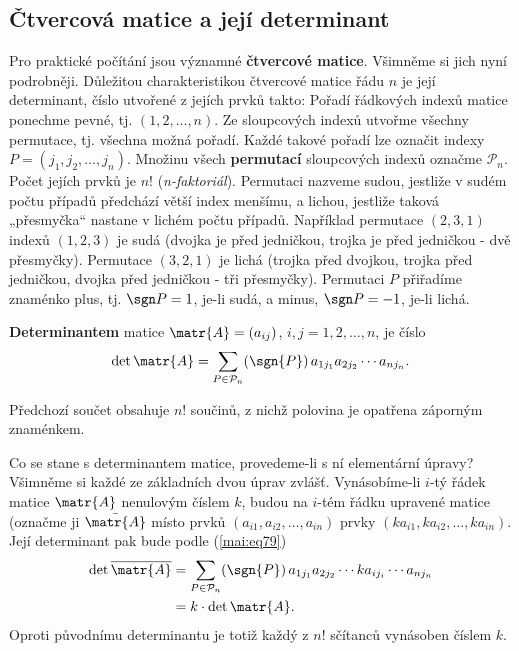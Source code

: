    \subsection{Čtvercová matice a její determinant}\label{mai:IchapIIsecIIIsubIV}
      Pro praktické počítání jsou významné \textbf{čtvercové matice}. Všimněme si jich nyní
      podrobněji. Důležitou charakteristikou čtvercové matice řádu \(n\) je její determinant, číslo
      utvořené z jejích prvků takto: Pořadí řádkových indexů matice ponechme pevné, tj. \((1,2,...,
      n)\). Ze sloupcových indexů utvořme všechny permutace, tj. všechna možná pořadí. Každé takové
      pořadí lze označit indexy \(P = (j_1, j_2, \ldots, j_n)\). Množinu všech \textbf{permutací}
      sloupcových indexů označme \(\mathcal{P}_n\). Počet jejích prvků je \(n!\)
      (\emph{n-faktoriál}). Permutaci nazveme sudou, jestliže v sudém počtu případů předchází větší
      index menšímu, a lichou, jestliže taková „přesmyčka“ nastane v lichém počtu případů. Například
      permutace \((2,3,1)\) indexů \((1,2,3)\) je sudá (dvojka je před jedničkou, trojka je před
      jedničkou - dvě přesmyčky). Permutace \((3,2,1)\) je lichá (trojka před dvojkou, trojka před
      jedničkou, dvojka před jedničkou - tři přesmyčky). Permutaci \(P\) přiřadíme znaménko plus,
      tj. \(\sgn P = 1\), je-li sudá, a minus, \(\sgn P = -1\), je-li lichá.

      \begin{mdframed}[style=highlight]
        \textbf{Determinantem} matice \(\matr{A}=(a_{ij})\), \(i,j = 1, 2, \ldots, n\), je číslo
        \begin{equation}\label{mai:eq79}
          \begin{gathered}
            \det{\matr{A}} = \sum_{P\in \mathcal{P}_n}(\sgn{P})\,a_{1j_1}a_{2j_2}\cdots a_{nj_n}.
          \end{gathered}
        \end{equation}
      \end{mdframed}
      Předchozí součet obsahuje \(n!\) součinů, z nichž polovina je opatřena záporným znaménkem.
      
      Co se stane s determinantem matice, provedeme-li s ní elementární úpravy? Všimněme si každé ze
      základních dvou úprav zvlášť. Vynásobíme-li \(i\)-tý řádek matice \(\matr{A}\) nenulovým
      číslem \(k\), budou na \(i\)-tém řádku upravené matice (označme ji \(\bar{\matr{A}}\) místo
      prvků \((a_{i1}, a_{i2}, \ldots, a_{in})\)  prvky \((ka_{i1}, ka_{i2}, \ldots, ka_{in})\).
      Její determinant pak bude podle (\ref{mai:eq79})
      \begin{align*}
        \det{\overline{\matr{A}}}  &= \sum_{P\in \mathcal{P}_n}
                                 (\sgn{P})\,a_{1j_1}a_{2j_2}\cdots ka_{ij_i} \cdots a_{nj_n}      \\
                                  &= k\cdot\det{\matr{A}}.
      \end{align*}
      Oproti původnímu determinantu je totiž každý z \(n!\) sčítanců vynásoben číslem \(k\).
      
